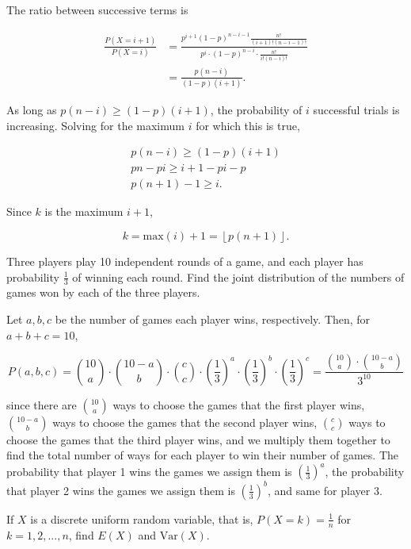 \documentclass[answers]{exam}
\begin{document}
\begin{questions}
\begin{solution}
The ratio between successive terms is 

\begin{align*}
    \frac{P(X=i+1)}{P(X=i)} &= \frac{p^{i+1}(1-p)^{n-i-1}\frac{n!}{(i+1)!(n-i-1)!}}{p^{i} \cdot (1-p)^{n-i} \cdot \frac{n!}{i!(n-i)!}} \\ 
    &= \frac{p(n-i)}{(1-p)(i+1)}
.\end{align*}

As long as $p(n-i) \ge (1-p)(i+1)$, the probability of $i$ successful
trials is increasing. Solving for the maximum $i$ for which this is true,

\begin{gather*}
p(n-i) \ge (1-p)(i+1) \\ 
pn - pi \ge  i + 1 - pi - p \\ 
p(n+1) - 1 \ge i.
\end{gather*}

Since $k$ is the maximum $i + 1$,

\[
    k = \text{max}(i) + 1 = \left\lfloor p(n+1) \right\rfloor
.\] 
\end{solution}

\question[10]
Three players play 10 independent rounds of a game, and each player has
probability \(\frac{1}{3}\) of winning each round. Find the joint distribution
of the numbers of games won by each of the three players.

\begin{solution}
Let $a,b,c$ be the number of games each player wins, respectively. Then, for $a
+ b + c = 10$, 

\[
P(a,b,c) = \binom{10}{a} \cdot \binom{10 - a}{b} \cdot \binom{c}{c} \cdot 
\left( \frac{1}{3} \right)^{a} \cdot \left( \frac{1}{3} \right) ^{b} \cdot \left( \frac{1}{3} \right) ^{c} 
= \frac{\binom{10}{a} \cdot \binom{10 - a}{b}}{3^{10}}
\] 

since there are $\binom{10}{a}$ ways to choose the games that the first player
wins, $\binom{10-a}{b}$ ways to choose the games that the second player wins, 
$\binom{c}{c}$ ways to choose the games that the third player wins, and we
multiply them together to find the total number of ways for each player to win
their number of games. The probability that player 1 wins the games we assign
them is $(\frac{1}{3})^{a}$, the probability that player 2 wins the games we
assign them is $(\frac{1}{3})^{b}$, and same for player 3.
\end{solution}

\question[10]
If \(X\) is a discrete uniform random variable, that is, \(P(X=k)=\frac{1}{n}\)
for \(k=1,2,...,n\), find \(E(X)\) and \(\text{Var}(X)\).


\end{questions}
\end{document}
